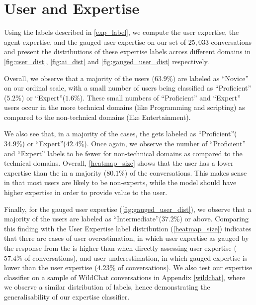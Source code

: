 \section{User and  Expertise}\label{expertise}
Using the labels described in \cref{exp_label}, we compute the user expertise, the agent expertise, and the gauged user expertise on our set of $25,033$ conversations and present the distributions of these expertise labels across different domains in \autoref{fig:user_dist}, \autoref{fig:ai_dist} and \autoref{fig:gauged_user_dist} respectively. 

Overall, we observe that a majority of the users ($63.9\%$) are labeled as ``Novice'' on our ordinal scale, with a small number of users being classified as ``Proficient'' ($5.2\%$) or ``Expert''($1.6\%$). These small numbers of ``Proficient'' and ``Expert'' users occur in the more technical domains (like Programming and scripting) as compared to the non-technical domains (like Entertainment).

We also see that, in a majority of the cases, the  gets labeled as ``Proficient''($34.9\%$) or ``Expert''($42.4\%$). Once again, we observe the number of ``Proficient'' and ``Expert'' labels to be fewer for non-technical domains as compared to the technical domains. Overall, \autoref{heatmap_size} shows that the user has a lower expertise than the  in a majority ($80.1\%$) of the conversations. This makes sense in that most users are likely to be non-experts, while the model should have higher expertise in order to provide value to the user.

Finally, for the gauged user expertise (\autoref{fig:gauged_user_dist}), we observe that a majority of the users are labeled as ``Intermediate''($37.2\%$) or above. Comparing this finding with the User Expertise label distribution (\autoref{heatmap_size}) indicates that there are cases of user overestimation, in which user expertise as gauged by the response from the  is higher than when directly assessing user expertise ($57.4\%$ of conversations), and user underestimation, in which gauged expertise is lower than the user expertise ($4.23\%$ of conversations). We also test our expertise classifier on a sample of WildChat \cite{zhao2024wildchat1mchatgptinteraction} conversations in Appendix \ref{wildchat}, where we observe a similar distribution of labels, hence demonstrating the generalisability of our expertise classifier. 